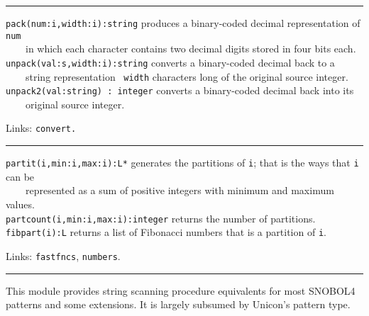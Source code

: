 \vspace{0.25cm}\hrule{}

\texttt{pack(num:i,width:i):string} produces a binary-coded decimal
representation of \texttt{num}\\
 \ \ \ \  in which each character contains two decimal
digits stored in four bits each.\\
\texttt{unpack(val:s,width:i):string} converts a binary-coded decimal
back to a\\
 \ \ \ \ string representation \ \texttt{width} characters long of the
original source integer.\\
\texttt{unpack2(val:string) : integer} converts a binary-coded decimal
back into its\\
 \ \ \ \ original source integer.

Links: \texttt{convert.}

\vspace{0.25cm}\hrule{}

\texttt{partit(i,min:i,max:i):L*} generates the partitions of
\texttt{i}; that is the ways that \texttt{i} can be\\
 \ \ \ \ represented as a sum of positive integers with minimum
and maximum values.\\
\texttt{partcount(i,min:i,max:i):integer} returns the number of
partitions.\\
\texttt{fibpart(i):L} returns a list of Fibonacci numbers that is a
partition of \texttt{i}.

Links: \texttt{fastfncs}, \texttt{numbers}. 

\vspace{0.25cm}\hrule{}

This module provides string scanning procedure equivalents for most
SNOBOL4 patterns and some
extensions. %
It is largely subsumed by Unicon's pattern type.



